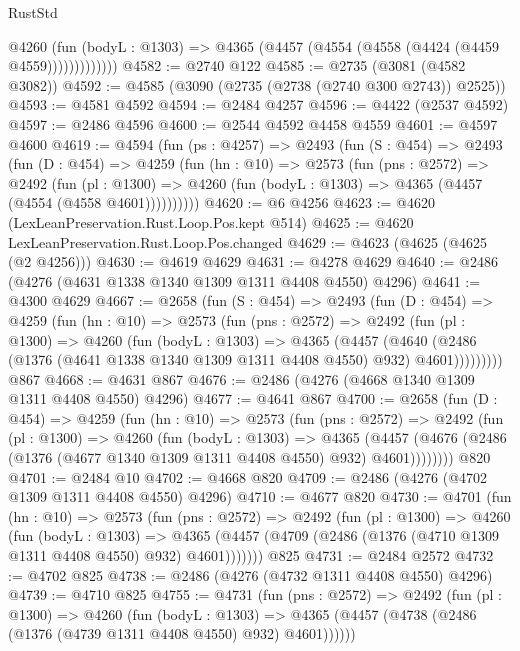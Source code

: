 \begin{lexlean}{RustStd}
\begin{coremodule}
                @4260
                  (fun (bodyL : @1303) =>
                  @4365 (@4457 (@4554 (@4558 (@4424 (@4459 @4559)))))))))))))
@4582 := @2740 @122
@4585 := @2735 (@3081 (@4582 @3082))
@4592 := @4585 (@3090 (@2735 (@2738 (@2740 @300 @2743)) @2525))
@4593 := @4581 @4592
@4594 := @2484 @4257
@4596 := @4422 (@2537 @4592)
@4597 := @2486 @4596
@4600 := @2544 @4592 @4458 @4559
@4601 := @4597 @4600
@4619 := @4594
    (fun (ps : @4257) =>
    @2493
      (fun (S : @454) =>
      @2493
        (fun (D : @454) =>
        @4259
          (fun (hn : @10) =>
          @2573
            (fun (pns : @2572) =>
            @2492
              (fun (pl : @1300) =>
              @4260 (fun (bodyL : @1303) => @4365 (@4457 (@4554 (@4558 @4601))))))))))
@4620 := @6 @4256
@4623 := @4620 (LexLeanPreservation.Rust.Loop.Pos.kept @514)
@4625 := @4620 LexLeanPreservation.Rust.Loop.Pos.changed
@4629 := @4623 (@4625 (@4625 (@2 @4256)))
@4630 := @4619 @4629
@4631 := @4278 @4629
@4640 := @2486 (@4276 (@4631 @1338 @1340 @1309 @1311 @4408 @4550) @4296)
@4641 := @4300 @4629
@4667 := @2658
    (fun (S : @454) =>
    @2493
      (fun (D : @454) =>
      @4259
        (fun (hn : @10) =>
        @2573
          (fun (pns : @2572) =>
          @2492
            (fun (pl : @1300) =>
            @4260
              (fun (bodyL : @1303) =>
              @4365
                (@4457
                  (@4640
                    (@2486 (@1376 (@4641 @1338 @1340 @1309 @1311 @4408 @4550) @932) @4601)))))))))
    @867
@4668 := @4631 @867
@4676 := @2486 (@4276 (@4668 @1340 @1309 @1311 @4408 @4550) @4296)
@4677 := @4641 @867
@4700 := @2658
    (fun (D : @454) =>
    @4259
      (fun (hn : @10) =>
      @2573
        (fun (pns : @2572) =>
        @2492
          (fun (pl : @1300) =>
          @4260
            (fun (bodyL : @1303) =>
            @4365
              (@4457 (@4676 (@2486 (@1376 (@4677 @1340 @1309 @1311 @4408 @4550) @932) @4601))))))))
    @820
@4701 := @2484 @10
@4702 := @4668 @820
@4709 := @2486 (@4276 (@4702 @1309 @1311 @4408 @4550) @4296)
@4710 := @4677 @820
@4730 := @4701
    (fun (hn : @10) =>
    @2573
      (fun (pns : @2572) =>
      @2492
        (fun (pl : @1300) =>
        @4260
          (fun (bodyL : @1303) =>
          @4365 (@4457 (@4709 (@2486 (@1376 (@4710 @1309 @1311 @4408 @4550) @932) @4601)))))))
    @825
@4731 := @2484 @2572
@4732 := @4702 @825
@4738 := @2486 (@4276 (@4732 @1311 @4408 @4550) @4296)
@4739 := @4710 @825
@4755 := @4731
    (fun (pns : @2572) =>
    @2492
      (fun (pl : @1300) =>
      @4260
        (fun (bodyL : @1303) =>
        @4365 (@4457 (@4738 (@2486 (@1376 (@4739 @1311 @4408 @4550) @932) @4601))))))

\end{coremodule}
\end{lexlean}
